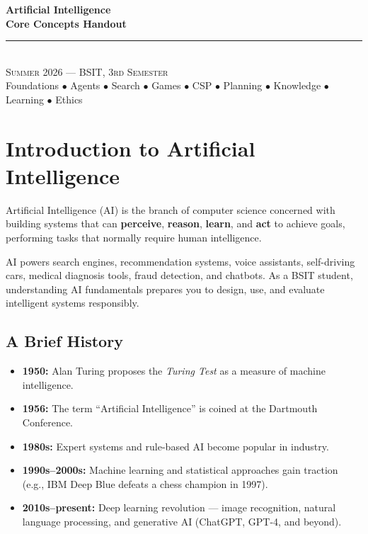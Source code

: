 \documentclass[11pt,a4paper]{article}
\begin{document}
\begin{center}
\vspace*{0.5cm}
{\Huge\bfseries\textcolor{primary}{Artificial Intelligence}}\\[8pt]
{\Huge\bfseries\textcolor{primary}{Core Concepts Handout}}\\[16pt]
{\color{secondary}\rule{0.68\textwidth}{1.5pt}}\\[14pt]
{\Large\textsc{Summer 2026 --- BSIT, 3rd Semester}}\\[8pt]
{\large\textcolor{gray!70!black}{Foundations $\bullet$ Agents $\bullet$ Search $\bullet$ Games $\bullet$ CSP $\bullet$ Planning $\bullet$ Knowledge $\bullet$ Learning $\bullet$ Ethics}}
\vspace{0.3cm}
\end{center}

\tableofcontents
\newpage

\section{Introduction to Artificial Intelligence}

\begin{definitionbox}
Artificial Intelligence (AI) is the branch of computer science concerned with building systems that can \textbf{perceive}, \textbf{reason}, \textbf{learn}, and \textbf{act} to achieve goals, performing tasks that normally require human intelligence.
\end{definitionbox}

\begin{conceptbox}
AI powers search engines, recommendation systems, voice assistants, self-driving cars, medical diagnosis tools, fraud detection, and chatbots. As a BSIT student, understanding AI fundamentals prepares you to design, use, and evaluate intelligent systems responsibly.
\end{conceptbox}

\subsection{A Brief History}
\begin{itemize}[leftmargin=*]
  \item \textbf{1950:} Alan Turing proposes the \emph{Turing Test} as a measure of machine intelligence.
  \item \textbf{1956:} The term ``Artificial Intelligence'' is coined at the Dartmouth Conference.
  \item \textbf{1980s:} Expert systems and rule-based AI become popular in industry.
  \item \textbf{1990s--2000s:} Machine learning and statistical approaches gain traction (e.g., IBM Deep Blue defeats a chess champion in 1997).
  \item \textbf{2010s--present:} Deep learning revolution --- image recognition, natural language processing, and generative AI (ChatGPT, GPT-4, and beyond).
\end{itemize}
\end{document}

